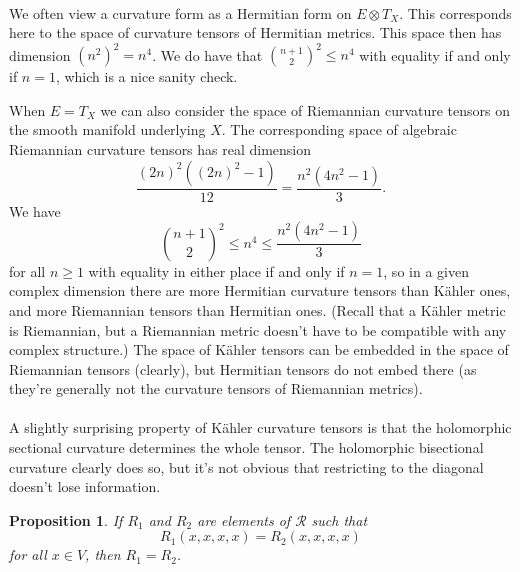 \documentclass[10pt,a4paper]{article}
\newtheorem{prop}[theo]{Proposition}
\newcommand{\cc}[1]{\mathcal{#1}}
\begin{document}
\paragraph{}





We often view a curvature form as a Hermitian form on $E \otimes T_X$. This corresponds here to the space of curvature tensors of Hermitian metrics. This space then has dimension $(n^2)^2 = n^4$. We do have that $\binom{n+1}{2}^2 \leq n^4$ with equality if and only if $n = 1$, which is a nice sanity check.

When $E = T_X$ we can also consider the space of Riemannian curvature tensors on the smooth manifold underlying $X$. The corresponding space of algebraic Riemannian curvature tensors has real dimension
$$
\frac{(2n)^2((2n)^2 - 1)}{12}
= \frac{n^2(4n^2 - 1)}{3}.
$$
We have
$$
\binom{n+1}{2}^2 \leq n^4 \leq \frac{n^2(4n^2 - 1)}{3}
$$
for all $n \geq 1$ with equality in either place if and only if $n = 1$, so in a given complex dimension there are more Hermitian curvature tensors than K\"ahler ones, and more Riemannian tensors than Hermitian ones. (Recall that a K\"ahler metric is Riemannian, but a Riemannian metric doesn't have to be compatible with any complex structure.) The space of K\"ahler tensors can be embedded in the space of Riemannian tensors (clearly), but Hermitian tensors do not embed there (as they're generally not the curvature tensors of Riemannian metrics).


\paragraph{}

A slightly surprising property of K\"ahler curvature tensors is that the holomorphic sectional curvature determines the whole tensor. The holomorphic bisectional curvature clearly does so, but it's not obvious that restricting to the diagonal doesn't lose information.

\begin{prop}
If $R_1$ and $R_2$ are elements of $\cc R$ such that
$$
R_1(x,x,x,x) = R_2(x,x,x,x)
$$
for all $x \in V$, then $R_1 = R_2$.
\end{prop}
\end{document}
